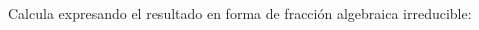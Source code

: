 \documentclass[addpoints,spanish, 12pt,a4paper]{exam}
\begin{document}
\begin{questions}
\begin{multicols}{1}
        \end{multicols}
        \question Calcula expresando el resultado en forma de fracción algebraica irreducible:
        \begin{multicols}{1}
        \end{multicols}
        
    \end{questions}
    
\end{document}
